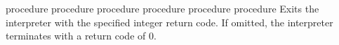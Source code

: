 \begin{entry}{%
 {procedure}
 {procedure}
 {procedure}
 {procedure}
 {procedure}
 {procedure}}
\saut
Exits the {\stk} interpreter with the specified integer return code. If
omitted, the interpreter terminates with a return code of 0.
\end{entry}

